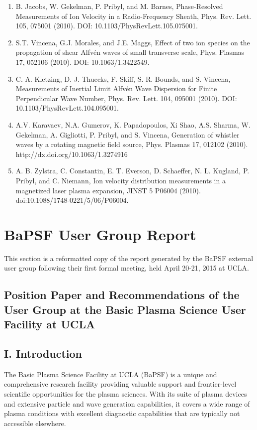 \documentclass[11pt]{article}
\begin{document}
\begin{enumerate}
\item   B. Jacobs, W. Gekelman, P. Pribyl, and M. Barnes, Phase-Resolved Measurements of Ion Velocity in a Radio-Frequency Sheath, Phys. Rev. Lett. 105, 075001 (2010). DOI: 10.1103/PhysRevLett.105.075001.

\item   S.T. Vincena, G.J. Morales, and J.E. Maggs, Effect of two ion species on the propagation of shear Alfv\'{e}n waves of small transverse scale, Phys. Plasmas 17, 052106 (2010). DOI: 10.1063/1.3422549.

\item   C. A. Kletzing, D. J. Thuecks, F. Skiff, S. R. Bounds, and S. Vincena, Measurements of Inertial Limit Alfv\'{e}n Wave Dispersion for Finite Perpendicular Wave Number, Phys. Rev. Lett. 104, 095001 (2010). DOI: 10.1103/PhysRevLett.104.095001.

\item  A.V. Karavaev, N.A. Gumerov, K. Papadopoulos, Xi Shao, A.S. Sharma, W. Gekelman, A. Gigliotti, P. Pribyl, and S. Vincena, Generation of whistler waves by a rotating magnetic field source, Phys. Plasmas 17, 012102 (2010). http://dx.doi.org/10.1063/1.3274916

\item  A. B. Zylstra, C. Constantin, E. T. Everson, D. Schaeffer, N. L. Kugland, P. Pribyl, and C. Niemann, Ion velocity distribution measurements in a magnetized laser plasma expansion, JINST 5 P06004 (2010). doi:10.1088/1748-0221/5/06/P06004.

\end{enumerate}

\newpage

\section{BaPSF User Group Report}
This section is a reformatted copy of the report generated by the BaPSF external user group following their first formal
meeting, held April 20-21, 2015 at UCLA.

\begin{center}
\subsection{Position Paper and Recommendations of the User Group
at the Basic Plasma Science User Facility at UCLA}
\end{center}

\subsection{I. Introduction}
The Basic Plasma Science Facility at UCLA (BaPSF) is a unique and comprehensive
research facility providing valuable support and frontier-level scientific opportunities for
the plasma sciences. With its suite of plasma devices and extensive particle and wave
generation capabilities, it covers a wide range of plasma conditions with excellent
diagnostic capabilities that are typically not accessible elsewhere.
\end{document}
